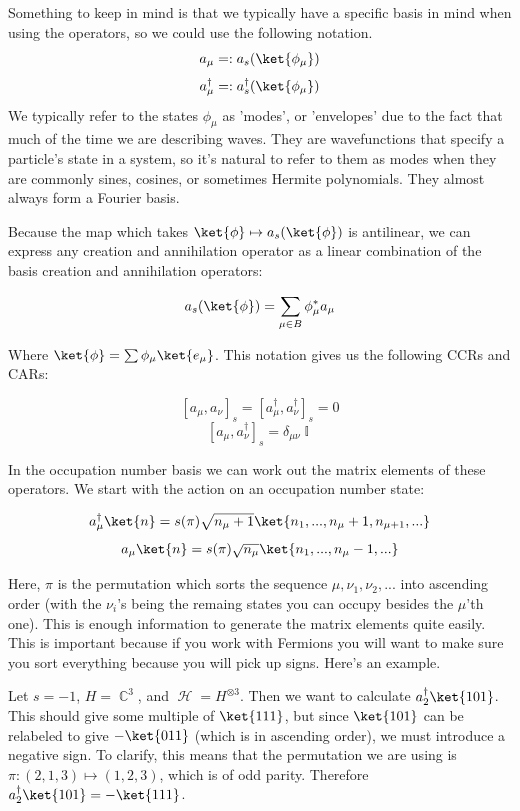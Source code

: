 \documentclass{article}
\DeclareMathOperator{\Hh}{{\mathcal{H}}}
\DeclareMathOperator{\II}{\mathbb{I}}
\DeclareMathOperator{\CC}{\mathbb{C}}
\begin{document}
Something to keep in mind is that we typically have a specific basis in mind when using the operators, so we could use the following notation.
\begin{equation}
a_\mu =: a_s(\ket{\phi_\mu})
\end{equation}
\begin{equation}
a_\mu^\dagger =: a_s^\dagger(\ket{\phi_\mu})
\end{equation}
We typically refer to the states $\phi_\mu$ as 'modes', or 'envelopes' due to the fact that much of the time we are describing waves. They are wavefunctions that specify a particle's state in a system, so it's natural to refer to them as modes when they are commonly sines, cosines, or sometimes Hermite polynomials. They almost always form a Fourier basis. 

Because the map which takes $\ket{\phi} \mapsto a_s(\ket{\phi})$ is antilinear, we can express any creation and annihilation operator as a linear combination of the basis creation and annihilation operators:

\begin{equation}
a_s(\ket{\phi}) = \sum_{\mu \in B}\phi_\mu^*a_\mu
\end{equation}

Where $\ket{\phi} = \sum \phi_\mu \ket{e_\mu}$. This notation gives us the following CCRs and CARs:

\[ [a_\mu,a_\nu]_s=[a_\mu^\dagger,a_\nu^\dagger]_s=0 \]
\[ [a_\mu,a_\nu^\dagger]_s=\delta_{\mu\nu}\II \]

In the occupation number basis we can work out the matrix elements of these operators. We start with the action on an occupation number state:

\[a_\mu^\dagger \ket{n} = s(\pi) \sqrt{n_\mu+1}\ket{n_1,...,n_\mu+1,n_{\mu+1},...}\]
\[a_\mu \ket{n} = s(\pi)\sqrt{n_\mu}\ket{n_1,...,n_\mu-1,...}\]

Here, $\pi$ is the permutation which sorts the sequence $\mu,\nu_1,\nu_2,...$ into ascending order (with the $\nu_i$'s being the remaing states you can occupy besides the $\mu$'th one). This is enough information to generate the matrix elements quite easily. This is important because if you work with Fermions you will want to make sure you sort everything because you will pick up signs. Here's an example.

Let $s = -1$, $H=\CC^3$, and $\Hh = H^{\otimes 3}$. Then we want to calculate $a_2^\dagger \ket{101}$. This should give some multiple of $\ket{111}$, but since $\ket{101}$ can be relabeled to give $-\ket{011}$  (which is in ascending order), we must introduce a negative sign. To clarify, this means that the permutation we are using is $\pi : (2,1,3)\mapsto (1,2,3)$, which is of odd parity. Therefore $a_2^\dagger \ket{101}=-\ket{111}$.
\end{document}
